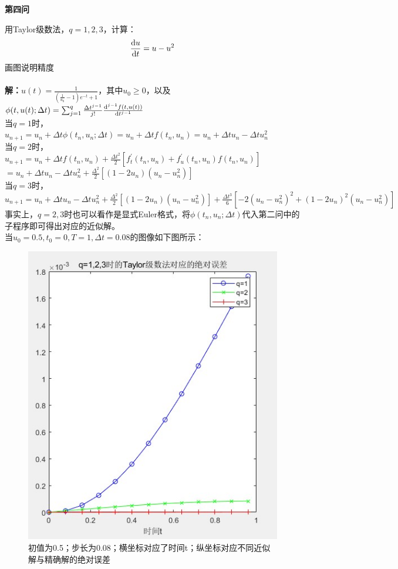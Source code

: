 \documentclass[12pt]{article}
\begin{document}
\begin{center}
	\textbf{第四问}
\end{center}
用Taylor级数法，$q=1,2,3$，计算：$$\frac{{\rm d}u}{{\rm d}t}=u-u^2$$画图说明精度\\
\\
\noindent \textbf{解：}$u(t)=\frac{1}{(\frac{1}{u_0}-1)e^{-t}+1}$，其中$u_0\ge0$，以及$\phi(t,u(t);\Delta{t})=\sum_{j=1}^{q}\frac{\Delta{t}^{j-1}}{j!}\frac{{\rm d}^{j-1}f(t,u(t))}{{\rm d} t^{j-1}}$\\
当$q=1$时，$u_{n+1}=u_n+\Delta{t}\phi(t_n,u_n;\Delta{t})=u_n+\Delta{t}f(t_n,u_n)=u_n+\Delta{t}u_n-\Delta{t}u_n^2$\\
当$q=2$时，$u_{n+1}=u_n+\Delta{t}f(t_n,u_n)+\frac{\Delta{t}^2}{2}[f^{'}_t(t_n,u_n)+f^{'}_u(t_n,u_n)f(t_n,u_n)]$\\$=u_n+\Delta{t}u_n-\Delta{t}u_n^2+\frac{\Delta^2}{2}[(1-2u_n)(u_n-u_n^2)]$\\
当$q=3$时，$u_{n+1}=u_n+\Delta{t}u_n-\Delta{t}u_n^2+\frac{\Delta^2}{2}[(1-2u_n)(u_n-u_n^2)]+\frac{\Delta{t}^3}{6}[-2(u_n-u_n^2)^2+(1-2u_n)^2(u_n-u_n^2)]$\\
事实上，$q=2,3$时也可以看作是显式Euler格式，将$\phi(t_n,u_n;\Delta{t})$代入第二问中的子程序即可得出对应的近似解。\\
当$u_0=0.5,t_0=0,T=1,\Delta{t}=0.08$的图像如下图所示：
\begin{figure}[H]
	\centering
	\includegraphics[width=1\textwidth]{3}
	\caption{初值为0.5；步长为0.08；横坐标对应了时间t；纵坐标对应不同近似解与精确解的绝对误差}
\end{figure}
\end{document}
